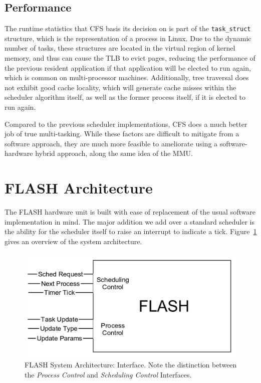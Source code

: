 \documentclass{sig-alternate-10pt}
\begin{document}
\subsection{Performance}
The runtime statistics that CFS basis its decision on is part of the \verb|task_struct| structure, which is the representation of a process in Linux. Due to the dynamic number of tasks, these structures are located in the virtual region of kernel memory, and thus can cause the TLB to evict pages, reducing the performance of the previous resident application if that application will be elected to run again, which is common on multi-processor machines. Additionally, tree traversal does not exhibit good cache locality, which will generate cache misses within the scheduler algorithm itself, as well as the former process itself, if it is elected to run again.

Compared to the previous scheduler implementations, CFS does a much better job of true multi-tasking. While these factors are difficult to mitigate from a software approach, they are much more feasible to ameliorate using a software-hardware hybrid approach, along the same idea of the MMU.

\section{FLASH Architecture}
The FLASH hardware unit is built with ease of replacement of the usual
software implementation in mind.  The major addition we add over a standard
scheduler is the ability for the scheduler itself to raise an interrupt to
indicate a tick. Figure~\ref{fig:arch_overview} gives an overview of the
system architecture.

\begin{figure}
	\begin{center}
		\includegraphics[width=0.9\linewidth]{fig/flash-diagram.png}
		\caption{
			FLASH System Architecture: Interface.  Note the distinction between
			the \emph{Process Control} and \emph{Scheduling Control} Interfaces.
		}
		\label{fig:arch_overview}
	\end{center}
\end{figure}
\end{document}
